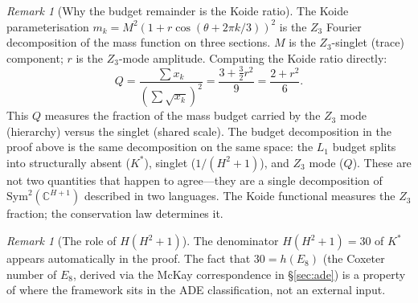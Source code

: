 \documentclass[11pt,a4paper]{article}
\theoremstyle{definition}
\theoremstyle{remark}
\newtheorem{remark}[theorem]{Remark}
\newcommand{\C}{\mathbb{C}}
\newcommand{\Sym}{\mathrm{Sym}}
\begin{document}
\begin{remark}[Why the budget remainder is the Koide ratio]\label{rem:Q_identification}
The Koide parameterisation $m_k=M^2(1+r\cos(\theta+2\pi k/3))^2$ is the $Z_3$ Fourier decomposition of the mass function on three sections. $M$ is the $Z_3$-singlet (trace) component; $r$ is the $Z_3$-mode amplitude. Computing the Koide ratio directly:
\[
Q = \frac{\sum x_k}{(\sum\sqrt{x_k})^2} = \frac{3+\tfrac{3}{2}r^2}{9} = \frac{2+r^2}{6}.
\]
This $Q$ measures the fraction of the mass budget carried by the $Z_3$ mode (hierarchy) versus the singlet (shared scale). The budget decomposition in the proof above is the same decomposition on the same space: the $L_1$ budget splits into structurally absent ($K^*$), singlet ($1/(H^2+1)$), and $Z_3$ mode ($Q$). These are not two quantities that happen to agree---they are a single decomposition of $\Sym^2(\C^{H+1})$ described in two languages. The Koide functional measures the $Z_3$ fraction; the conservation law determines it.
\end{remark}

\begin{remark}[The role of $H(H^2+1)$]\label{rem:hE8}
The denominator $H(H^2+1)=30$ of $K^*$ appears automatically in the proof. The fact that $30=h(E_8)$ (the Coxeter number of $E_8$, derived via the McKay correspondence in \S\ref{sec:ade}) is a property of where the framework sits in the ADE classification, not an external input.
\end{remark}
\end{document}
